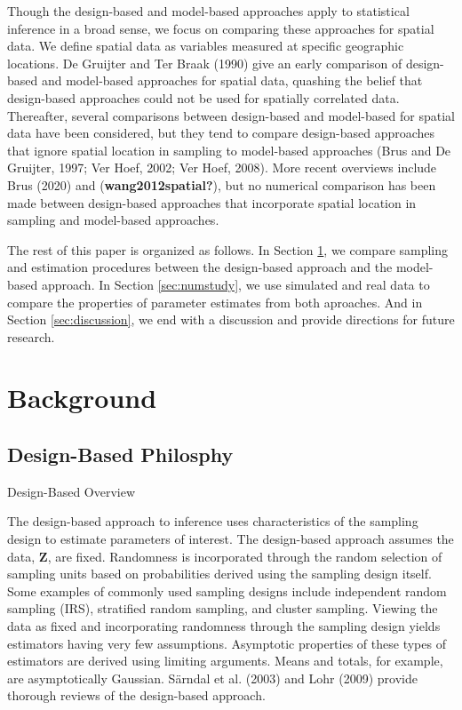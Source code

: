 \documentclass[]{elsarticle} %
\begin{document}
Though the design-based and model-based approaches apply to statistical
inference in a broad sense, we focus on comparing these approaches for
spatial data. We define spatial data as variables measured at specific
geographic locations. De Gruijter and Ter Braak (1990) give an early
comparison of design-based and model-based approaches for spatial data,
quashing the belief that design-based approaches could not be used for
spatially correlated data. Thereafter, several comparisons between
design-based and model-based for spatial data have been considered, but
they tend to compare design-based approaches that ignore spatial
location in sampling to model-based approaches (Brus and De Gruijter,
1997; Ver Hoef, 2002; Ver Hoef, 2008). More recent overviews include
Brus (2020) and (\textbf{wang2012spatial?}), but no numerical comparison
has been made between design-based approaches that incorporate spatial
location in sampling and model-based approaches.

The rest of this paper is organized as follows. In Section
\ref{sec:background}, we compare sampling and estimation procedures
between the design-based approach and the model-based approach. In
Section \ref{sec:numstudy}, we use simulated and real data to compare
the properties of parameter estimates from both aproaches. And in
Section \ref{sec:discussion}, we end with a discussion and provide
directions for future research.

\hypertarget{sec:background}{%
\section{Background}\label{sec:background}}

\hypertarget{design-based-philosphy}{%
\subsection{Design-Based Philosphy}\label{design-based-philosphy}}

Design-Based Overview

The design-based approach to inference uses characteristics of the
sampling design to estimate parameters of interest. The design-based
approach assumes the data, \(\mathbf{Z}\), are fixed. Randomness is
incorporated through the random selection of sampling units based on
probabilities derived using the sampling design itself. Some examples of
commonly used sampling designs include independent random sampling
(IRS), stratified random sampling, and cluster sampling. Viewing the
data as fixed and incorporating randomness through the sampling design
yields estimators having very few assumptions. Asymptotic properties of
these types of estimators are derived using limiting arguments. Means
and totals, for example, are asymptotically Gaussian. Särndal et al.
(2003) and Lohr (2009) provide thorough reviews of the design-based
approach.
\end{document}
